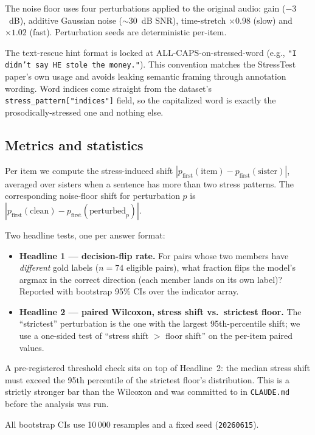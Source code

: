 \documentclass[11pt]{article}
\begin{document}
The noise floor uses four perturbations applied to the original
audio: gain ($-3$~dB), additive Gaussian noise ($\sim$30~dB SNR),
time-stretch $\times 0.98$ (slow) and $\times 1.02$ (fast).
Perturbation seeds are deterministic per-item.

The text-rescue hint format is locked at
ALL-CAPS-on-stressed-word (e.g., \texttt{"I didn't say HE stole the
money."}). This convention matches the StressTest paper's own
usage and avoids leaking semantic framing through annotation
wording. Word indices come straight from the dataset's
\texttt{stress\_pattern["indices"]} field, so the capitalized word
is exactly the prosodically-stressed one and nothing else.

\subsection{Metrics and statistics}

Per item we compute the stress-induced shift
$|p_{\text{first}}(\text{item}) - p_{\text{first}}(\text{sister})|$,
averaged over sisters when a sentence has more than two stress
patterns. The corresponding noise-floor shift for perturbation $p$
is $|p_{\text{first}}(\text{clean}) - p_{\text{first}}
(\text{perturbed}_p)|$.

Two headline tests, one per answer format:

\begin{itemize}
    \item \textbf{Headline 1 --- decision-flip rate.} For pairs whose
    two members have \emph{different} gold labels ($n = 74$ eligible
    pairs), what fraction flips the model's argmax in the correct
    direction (each member lands on its own label)? Reported with
    bootstrap 95\% CIs over the indicator array.
    \item \textbf{Headline 2 --- paired Wilcoxon, stress shift vs.\
    strictest floor.} The ``strictest'' perturbation is the one
    with the largest 95th-percentile shift; we use a one-sided
    test of ``stress shift $>$ floor shift'' on the per-item
    paired values.
\end{itemize}

A pre-registered threshold check sits on top of Headline~2: the
median stress shift must exceed the 95th percentile of the
strictest floor's distribution. This is a strictly stronger bar
than the Wilcoxon and was committed to in \texttt{CLAUDE.md}
before the analysis was run.

All bootstrap CIs use 10\,000 resamples and a fixed seed
(\texttt{20260615}).
\end{document}
